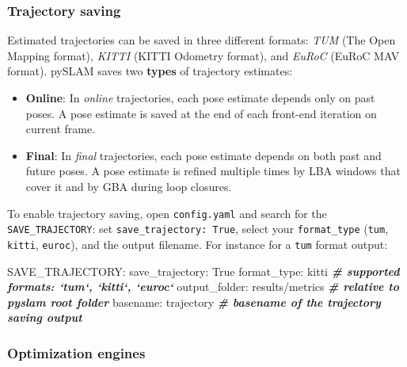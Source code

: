 \documentclass{article}
\newenvironment{Shaded}{\begin{snugshade}}{\end{snugshade}}
\newcommand{\CommentTok}[1]{\textcolor[rgb]{0.00,0.40,1.00}{\textbf{\textit{#1}}}}
\newcommand{\ExtensionTok}[1]{\textcolor[rgb]{0.74,0.68,0.62}{#1}}
\newcommand{\NormalTok}[1]{\textcolor[rgb]{0.74,0.68,0.62}{#1}}
\providecommand{\tightlist}{%
  \setlength{\itemsep}{0pt}\setlength{\parskip}{0pt}}
\begin{document}
\hypertarget{trajectory-saving}{%
\subsubsection{Trajectory saving}\label{trajectory-saving}}

Estimated trajectories can be saved in three different formats:
\emph{TUM} (The Open Mapping format), \emph{KITTI} (KITTI Odometry
format), and \emph{EuRoC} (EuRoC MAV format). pySLAM saves two
\textbf{types} of trajectory estimates:

\begin{itemize}
\tightlist
\item
  \textbf{Online}: In \emph{online} trajectories, each pose estimate
  depends only on past poses. A pose estimate is saved at the end of
  each front-end iteration on current frame.
\item
  \textbf{Final}: In \emph{final} trajectories, each pose estimate
  depends on both past and future poses. A pose estimate is refined
  multiple times by LBA windows that cover it and by GBA during loop
  closures.
\end{itemize}

To enable trajectory saving, open \texttt{config.yaml} and search for
the \texttt{SAVE\_TRAJECTORY}: set \texttt{save\_trajectory:\ True},
select your \texttt{format\_type} (\texttt{tum}, \texttt{kitti},
\texttt{euroc}), and the output filename. For instance for a
\texttt{tum} format output: \\

\begin{scriptsize}
\begin{Shaded}
\begin{Highlighting}[]
\ExtensionTok{SAVE_TRAJECTORY}\NormalTok{:}
  \ExtensionTok{save_trajectory}\NormalTok{: True}
  \ExtensionTok{format_type}\NormalTok{: kitti             }\CommentTok{# supported formats: `tum`, `kitti`, `euroc`}
  \ExtensionTok{output_folder}\NormalTok{: results/metrics }\CommentTok{# relative to pyslam root folder }
  \ExtensionTok{basename}\NormalTok{: trajectory           }\CommentTok{# basename of the trajectory saving output}
\end{Highlighting}
\end{Shaded}
\end{scriptsize}

\hypertarget{optimization-engines}{%
\subsubsection{Optimization engines}\label{optimization-engines}}
\end{document}
